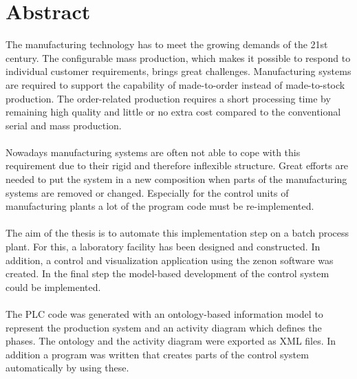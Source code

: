 \chapter*{Abstract}

The manufacturing technology has to meet the growing demands of the 21st century. The configurable mass production, which makes it possible to respond to individual customer requirements, brings great challenges. Manufacturing systems are required to support the capability of made-to-order instead of made-to-stock production. The order-related production requires a short processing time by remaining high quality and little or no extra cost compared to the conventional serial and mass production. \\\\
Nowadays manufacturing systems are often not able to cope with this requirement due to their rigid and therefore inflexible structure. Great efforts are needed to put the system in a new composition when parts of the manufacturing systems are removed or changed. Especially for the control units of manufacturing plants a lot of the program code must be re-implemented.\\\\
The aim of the thesis is to automate this implementation step on a batch process plant. For this, a laboratory facility has been designed and constructed. In addition, a control and visualization application using the zenon software was created. In the final step the model-based development of the control system could be implemented.\\\\
The PLC code was generated with an ontology-based information model to represent the production system and an activity diagram which defines the phases. The ontology and the activity diagram were exported as XML files. In addition a program was written that creates parts of the control system automatically by using these.

